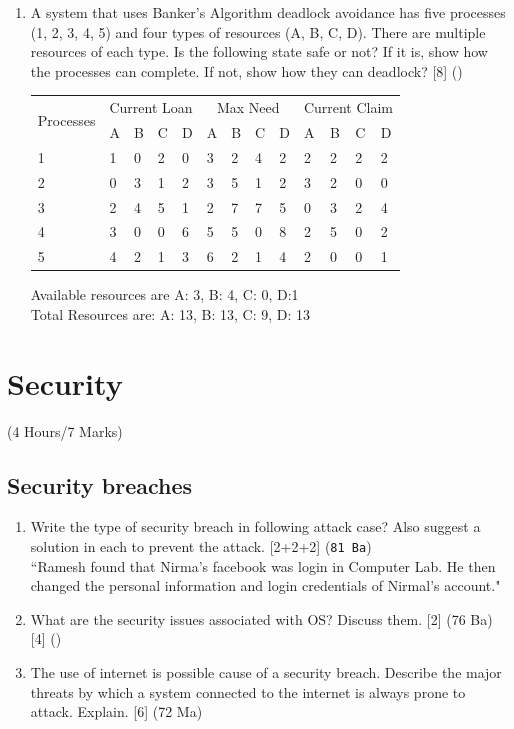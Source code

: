 \documentclass[12pt]{article}
\begin{document}
\begin{enumerate}
			\item A system that uses Banker's Algorithm deadlock avoidance has five processes (1, 2, 3, 4, 5) and four types of resources (A, B, C, D). There are multiple resources of each type. Is the following state safe or not? If it is, show how the processes can complete. If not, show how they can deadlock? \hfill [8] ()
			\begin{tabular}{|p{17mm}|p{7mm}|p{7mm}|p{7mm}|p{7mm}||p{7mm}|p{7mm}|p{7mm}|p{7mm}|p{7mm}|p{7mm}|p{7mm}|p{7mm}|}
				\hline
				\multirow{2}{*}{Processes} & \multicolumn{4}{|c||}{Current Loan} & \multicolumn{4}{|c|}{Max Need} &  \multicolumn{4}{|c||}{Current Claim} \\ \cline{2-7}
				& A & B & C & D & A & B & C & D & A & B & C & D \\ \hline
				1 & 1 & 0 & 2 & 0 & 3 & 2 & 4 & 2 & 2 & 2 & 2 & 2\\ \hline
				2 & 0 & 3 & 1 & 2 & 3 & 5 & 1 & 2 & 3 & 2 & 0 & 0\\ \hline
				3 & 2 & 4 & 5 & 1 & 2 & 7 & 7 & 5 & 0 & 3 & 2 & 4\\ \hline
				4 & 3 & 0 & 0 & 6 & 5 & 5 & 0 & 8 & 2 & 5 & 0 & 2\\ \hline
				5 & 4 & 2 & 1 & 3 & 6 & 2 & 1 & 4 & 2 & 0 & 0 & 1\\ \hline
			\end{tabular}
			Available resources are A: 3, B: 4, C: 0, D:1\\
			Total Resources are: A: 13, B: 13, C: 9, D: 13			
		\end{enumerate}

	\pagebreak

\section{Security}
	\begin{center}(4 Hours/7 Marks)\end{center}
	\subsection{Security breaches}
		\begin{enumerate}
			\item Write the type of security breach in following attack case? Also suggest a solution in each to prevent the attack. \hfill [2+2+2] (\texttt{81 Ba})\\
			``Ramesh found that Nirma's facebook was login in Computer Lab. He then changed the personal information and login credentials of Nirmal's account."

			\item What are the security issues associated with OS? Discuss them. \hfill [2] (76 Ba) [4] ()

			\item The use of internet is possible cause of a security breach. Describe the major threats by which a system connected to the internet is always prone to attack. Explain. \hfill [6] (72 Ma)
		\end{enumerate}
\end{document}
